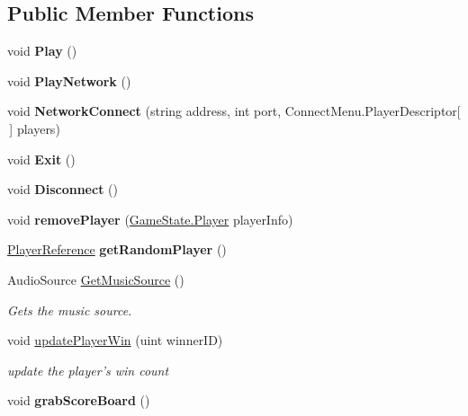 \subsection*{Public Member Functions}
\begin{DoxyCompactItemize}
\item 
\hypertarget{class_game_manager_a3403831c40f16191e3997be60d95380b}{void {\bfseries Play} ()}\label{class_game_manager_a3403831c40f16191e3997be60d95380b}

\item 
\hypertarget{class_game_manager_a1138f86278583414cba9456d02d0fa1c}{void {\bfseries Play\-Network} ()}\label{class_game_manager_a1138f86278583414cba9456d02d0fa1c}

\item 
\hypertarget{class_game_manager_a3c3a8e05664851d7642c13989af691cf}{void {\bfseries Network\-Connect} (string address, int port, Connect\-Menu.\-Player\-Descriptor\mbox{[}$\,$\mbox{]} players)}\label{class_game_manager_a3c3a8e05664851d7642c13989af691cf}

\item 
\hypertarget{class_game_manager_a5d9cafdd495a4ed2760de13b7b9c80b6}{void {\bfseries Exit} ()}\label{class_game_manager_a5d9cafdd495a4ed2760de13b7b9c80b6}

\item 
\hypertarget{class_game_manager_adb53a672ec492ed3a0cb89ca00808bd4}{void {\bfseries Disconnect} ()}\label{class_game_manager_adb53a672ec492ed3a0cb89ca00808bd4}

\item 
\hypertarget{class_game_manager_aebdaf24911f168c490194f548297f8d1}{void {\bfseries remove\-Player} (\hyperlink{struct_game_state_1_1_player}{Game\-State.\-Player} player\-Info)}\label{class_game_manager_aebdaf24911f168c490194f548297f8d1}

\item 
\hypertarget{class_game_manager_a5682ae7c68535cd62fa0791e3c859811}{\hyperlink{class_player_reference}{Player\-Reference} {\bfseries get\-Random\-Player} ()}\label{class_game_manager_a5682ae7c68535cd62fa0791e3c859811}

\item 
Audio\-Source \hyperlink{class_game_manager_abf59d5ce551af5e35529f71a99d89d76}{Get\-Music\-Source} ()
\begin{DoxyCompactList}\small\item\em Gets the music source. \end{DoxyCompactList}\item 
void \hyperlink{class_game_manager_a6a788456fbde7a3587013f1707586f73}{update\-Player\-Win} (uint winner\-I\-D)
\begin{DoxyCompactList}\small\item\em update the player's win count \end{DoxyCompactList}\item 
\hypertarget{class_game_manager_a414dcfd0d1f5a5904d2440165e42923d}{void {\bfseries grab\-Score\-Board} ()}\label{class_game_manager_a414dcfd0d1f5a5904d2440165e42923d}

\end{DoxyCompactItemize}
